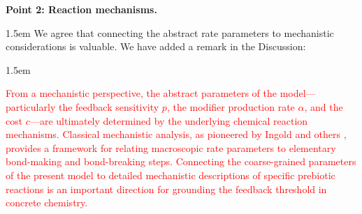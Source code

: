 \documentclass[11pt]{article}
\newcommand{\rev}[1]{\textcolor{red}{#1}}
\newenvironment{response}{\medskip\begin{adjustwidth}{1.5em}{}\color{blue}\mdseries\sloppy}{\end{adjustwidth}\color{black}}
\newenvironment{manuscript}{%
  \begin{adjustwidth}{1.5em}{}%
  \begin{mdframed}[
    topline=false, bottomline=false, rightline=false,
    linewidth=2pt, linecolor=red,
    innerleftmargin=1em, innerrightmargin=0pt,
    innertopmargin=0.4em, innerbottommargin=0.4em,
    skipabove=\medskipamount, skipbelow=\medskipamount
  ]\color{black}%
}{%
  \end{mdframed}%
  \end{adjustwidth}%
}
\begin{document}
\noindent\textbf{Point 2: Reaction mechanisms.}

\begin{response}
We agree that connecting the abstract rate parameters to mechanistic considerations is valuable. We have added a remark in the Discussion:
\end{response}

\begin{manuscript}\rev{From a mechanistic perspective, the abstract parameters of the model---particularly the feedback sensitivity $p$, the modifier production rate $\alpha$, and the cost $c$---are ultimately determined by the underlying chemical reaction mechanisms. Classical mechanistic analysis, as pioneered by Ingold and others \citep{Ingold1953}, provides a framework for relating macroscopic rate parameters to elementary bond-making and bond-breaking steps. Connecting the coarse-grained parameters of the present model to detailed mechanistic descriptions of specific prebiotic reactions is an important direction for grounding the feedback threshold in concrete chemistry.}
\end{manuscript}


\clearpage


\end{document}
